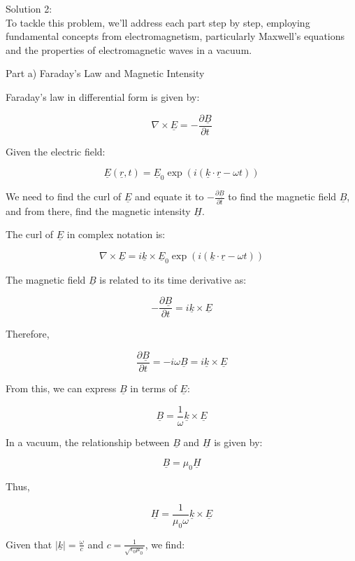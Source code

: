 \documentclass[a4paper,11pt]{article}
\begin{document}
\noindent Solution 2: \\

To tackle this problem, we'll address each part step by step, employing fundamental concepts from electromagnetism, particularly Maxwell's equations and the properties of electromagnetic waves in a vacuum.

Part a) Faraday’s Law and Magnetic Intensity

Faraday's law in differential form is given by:

\[
\nabla \times \underline{E} = -\frac{\partial \underline{B}}{\partial t}
\]

Given the electric field:

\[
\underline{E}(\underline{r}, t) = \underline{E}_{0} \exp(i(\underline{k} \cdot \underline{r} - \omega t))
\]

We need to find the curl of \(\underline{E}\) and equate it to \(-\frac{\partial \underline{B}}{\partial t}\) to find the magnetic field \(\underline{B}\), and from there, find the magnetic intensity \(\underline{H}\).

The curl of \(\underline{E}\) in complex notation is:

\[
\nabla \times \underline{E} = i\underline{k} \times \underline{E}_{0} \exp(i(\underline{k} \cdot \underline{r} - \omega t))
\]

The magnetic field \(\underline{B}\) is related to its time derivative as:

\[
-\frac{\partial \underline{B}}{\partial t} = i\underline{k} \times \underline{E}
\]

Therefore,

\[
\frac{\partial \underline{B}}{\partial t} = -i\omega \underline{B} = i\underline{k} \times \underline{E}
\]

From this, we can express \(\underline{B}\) in terms of \(\underline{E}\):

\[
\underline{B} = \frac{1}{\omega} \underline{k} \times \underline{E}
\]

In a vacuum, the relationship between \(\underline{B}\) and \(\underline{H}\) is given by:

\[
\underline{B} = \mu_{0} \underline{H}
\]

Thus,

\[
\underline{H} = \frac{1}{\mu_{0}\omega} \underline{k} \times \underline{E}
\]

Given that \(|\underline{k}| = \frac{\omega}{c}\) and \(c = \frac{1}{\sqrt{\epsilon_{0}\mu_{0}}}\), we find:
\end{document}
